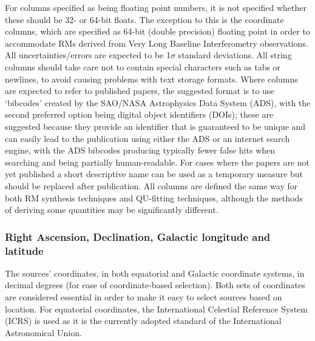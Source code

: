 \documentclass[10pt,modern]{aastex63}
\begin{document}
For columns specified as being floating point numbers, it is not specified whether these should be 32- or 64-bit floats. The exception to this is the coordinate columns, which are specified as 64-bit (double precision) floating point in order to accommodate RMs derived from Very Long Baseline Interferometry observations.
All uncertainties/errors are expected to be 1$\sigma$ standard deviations. All string columns should take care not to contain special characters such as tabs or newlines, to avoid causing problems with text storage formats.
Where columns are expected to refer to published papers, the suggested format is to use `bibcodes' created by the SAO/NASA Astrophysics Data System (ADS), with the second preferred option being digital object identifiers (DOIs); these are suggested because they provide an identifier that is guaranteed to be unique and can easily lead to the publication using either the ADS or an internet search engine, with the ADS bibcodes producing typically fewer false hits when searching and being partially human-readable. For cases where the papers are not yet published a short descriptive name can be used as a temporary measure but should be replaced after publication.
All columns are defined the same way for both RM synthesis techniques and QU-fitting techniques, although the methods of deriving some quantities may be significantly different.

\subsubsection{Right Ascension, Declination, Galactic longitude and latitude}
The sources' coordinates, in both equatorial and Galactic coordinate systems, in decimal degrees (for ease of coordinate-based selection). Both sets of coordinates are considered essential in order to make it easy to select sources based on location. For equatorial coordinates, the International Celestial Reference System (ICRS) is used as it is the currently adopted standard of the International Astronomical Union.
\end{document}
